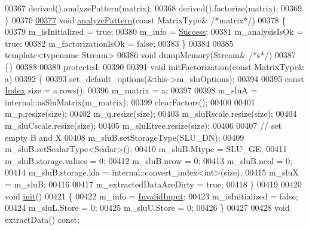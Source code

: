 \begin{DoxyCode}
00367       derived().analyzePattern(matrix);
00368       derived().factorize(matrix);
00369     \}
00370 
\hyperlink{class_eigen_1_1_super_l_u_base_a2d3f48425328d9b3cbdca369889007f3}{00377}     \textcolor{keywordtype}{void} \hyperlink{class_eigen_1_1_super_l_u_base_a2d3f48425328d9b3cbdca369889007f3}{analyzePattern}(\textcolor{keyword}{const} MatrixType& \textcolor{comment}{/*matrix*/})
00378     \{
00379       m\_isInitialized = \textcolor{keyword}{true};
00380       m\_info = \hyperlink{group__enums_gga85fad7b87587764e5cf6b513a9e0ee5ea52581b035f4b59c203b8ff999ef5fcea}{Success};
00381       m\_analysisIsOk = \textcolor{keyword}{true};
00382       m\_factorizationIsOk = \textcolor{keyword}{false};
00383     \}
00384     
00385     \textcolor{keyword}{template}<\textcolor{keyword}{typename} Stream>
00386     \textcolor{keywordtype}{void} dumpMemory(Stream& \textcolor{comment}{/*s*/})
00387     \{\}
00388     
00389   \textcolor{keyword}{protected}:
00390     
00391     \textcolor{keywordtype}{void} initFactorization(\textcolor{keyword}{const} MatrixType& a)
00392     \{
00393       set\_default\_options(&this->m\_sluOptions);
00394       
00395       \textcolor{keyword}{const} \hyperlink{namespace_eigen_a62e77e0933482dafde8fe197d9a2cfde}{Index} size = a.rows();
00396       m\_matrix = a;
00397 
00398       m\_sluA = internal::asSluMatrix(m\_matrix);
00399       clearFactors();
00400 
00401       m\_p.resize(size);
00402       m\_q.resize(size);
00403       m\_sluRscale.resize(size);
00404       m\_sluCscale.resize(size);
00405       m\_sluEtree.resize(size);
00406 
00407       \textcolor{comment}{// set empty B and X}
00408       m\_sluB.setStorageType(SLU\_DN);
00409       m\_sluB.setScalarType<Scalar>();
00410       m\_sluB.Mtype          = SLU\_GE;
00411       m\_sluB.storage.values = 0;
00412       m\_sluB.nrow           = 0;
00413       m\_sluB.ncol           = 0;
00414       m\_sluB.storage.lda    = internal::convert\_index<int>(size);
00415       m\_sluX                = m\_sluB;
00416       
00417       m\_extractedDataAreDirty = \textcolor{keyword}{true};
00418     \}
00419     
00420     \textcolor{keywordtype}{void} \hyperlink{structinit}{init}()
00421     \{
00422       m\_info = \hyperlink{group__enums_gga85fad7b87587764e5cf6b513a9e0ee5ea945604f62795ffc70aedf2bd12ea0434}{InvalidInput};
00423       m\_isInitialized = \textcolor{keyword}{false};
00424       m\_sluL.Store = 0;
00425       m\_sluU.Store = 0;
00426     \}
00427     
00428     \textcolor{keywordtype}{void} extractData() \textcolor{keyword}{const};

\end{DoxyCode}
